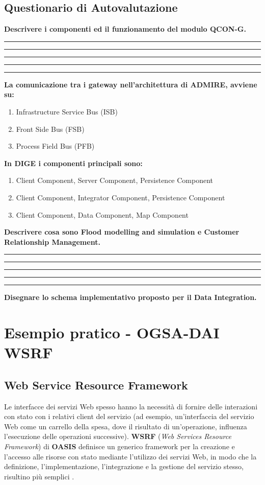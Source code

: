 \documentclass[11pt]{article}
\newcommand{\voceU}[1]{%
	\item #1\dotfill\Square%
}
\begin{document}
\newpage

\subsection{Questionario di Autovalutazione}
\textbf{Descrivere i componenti ed il funzionamento del modulo QCON-G.}\\[5ex]
\rule[5mm]{\textwidth}{0.1mm} 
\rule[5mm]{\textwidth}{0.1mm} 
\rule[5mm]{\textwidth}{0.1mm} 
\rule[5mm]{\textwidth}{0.1mm} 
\rule[5mm]{\textwidth}{0.1mm} 
\textbf{La comunicazione tra i gateway nell'architettura di ADMIRE, avviene su: }
\begin{enumerate}
	\voceU{Infrastructure Service Bus (ISB)}
	\voceU{Front Side Bus (FSB)}
	\voceU{Process Field Bus (PFB)}\\
\end{enumerate}
\textbf{In DIGE i componenti principali sono:}
\begin{enumerate}
	\voceU{Client Component, Server Component, Persistence Component}
	\voceU{ Client Component, Integrator Component, Persistence Component}
	\voceU{Client Component, Data Component, Map Component}\\
\end{enumerate}
\textbf{Descrivere cosa sono Flood modelling and simulation e Customer Relationship Management.}\\[5ex]
\rule[5mm]{\textwidth}{0.1mm} 
\rule[5mm]{\textwidth}{0.1mm} 
\rule[5mm]{\textwidth}{0.1mm} 
\rule[5mm]{\textwidth}{0.1mm} 
\rule[5mm]{\textwidth}{0.1mm} 
\textbf{Disegnare lo schema implementativo proposto per il Data Integration.}
\newpage


\section{Esempio pratico - OGSA-DAI WSRF}
\subsection{Web Service Resource Framework}
Le interfacce dei servizi Web spesso hanno la necessità di fornire delle interazioni con stato con i relativi client del servizio (ad esempio, un'interfaccia del servizio Web come un carrello della spesa, dove il risultato di un'operazione, influenza l'esecuzione delle operazioni successive). \textbf{WSRF} (\emph{Web Services Resource Framework}) di \textbf{OASIS} definisce un generico framework per la creazione e l'accesso alle risorse con stato mediante l'utilizzo dei servizi Web, in modo che la definizione, l'implementazione, l'integrazione e la gestione del servizio stesso, risultino più semplici \cite{ogsadai}.\\
\end{document}
